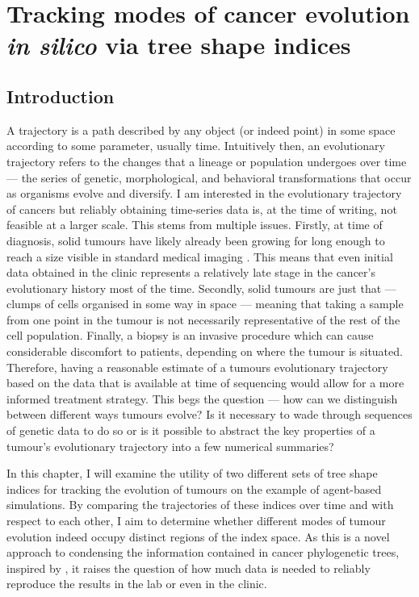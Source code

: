 \chapter{Tracking modes of cancer evolution \textit{in silico} via tree shape
indices}\label{chapter:trajectories}


\section{Introduction}
A trajectory is a path described by any object (or indeed point) in some space
according to some parameter, usually time.  Intuitively then, an evolutionary
trajectory refers to the changes that a lineage or population undergoes over
time --- the series of genetic, morphological, and behavioral transformations
that occur as organisms evolve and diversify. I am interested in the
evolutionary trajectory of cancers but reliably obtaining time-series data is,
at the time of writing, not feasible at a larger scale. This stems from multiple
issues. Firstly, at time of diagnosis, solid tumours have likely already been
growing for long enough to reach a size visible in standard medical imaging
\cite{patrone_how_2011}. This means that even initial data obtained in the
clinic represents a relatively late stage in the cancer's evolutionary history
most of the time. Secondly, solid tumours are just that --- clumps of cells
organised in some way in space --- meaning that taking a sample from one point
in the tumour is not necessarily representative of the rest of the cell
population. Finally, a biopsy is an invasive procedure which can cause
considerable discomfort to patients, depending on where the tumour is situated.
Therefore, having a reasonable estimate of a tumours evolutionary trajectory
based on the data that is available at time of sequencing would allow for a more
informed treatment strategy. This begs the question --- how can we distinguish
between different ways tumours evolve? Is it necessary to wade through sequences
of genetic data to do so or is it possible to abstract the key properties of a
tumour's evolutionary trajectory into a few numerical summaries? \par
In this chapter, I will examine the utility of two different sets of tree shape
indices for tracking the evolution of tumours on the example of agent-based
simulations. By comparing the trajectories of these indices over time and with
respect to each other, I aim to determine whether different modes of tumour
evolution indeed occupy distinct regions of the index space. As this is a novel
approach to condensing the information contained in cancer phylogenetic trees,
inspired by \cite{noble_spatial_2022}, it raises the question of how much data
is needed to reliably reproduce the results in the lab or even in the clinic.


